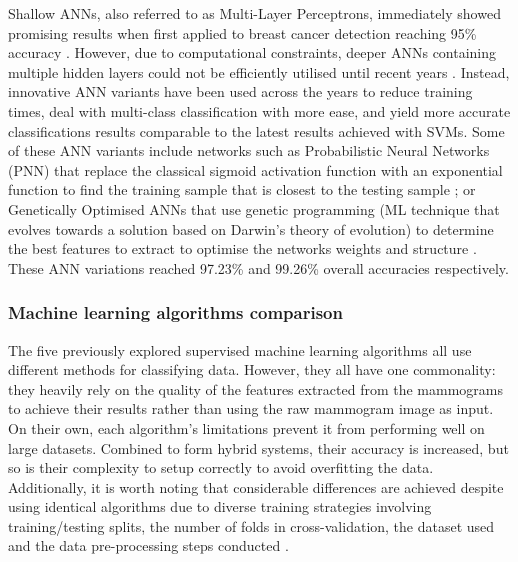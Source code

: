 Shallow ANNs, also referred to as Multi-Layer Perceptrons, immediately showed promising results when first applied to breast cancer detection reaching 95\% accuracy \cite{Wu1993}. However, due to computational constraints, deeper ANNs containing multiple hidden layers could not be efficiently utilised until recent years \cite{Litjens2017}. Instead, innovative ANN variants have been used across the years to reduce training times, deal with multi-class classification with more ease, and yield more accurate classifications results comparable to the latest results achieved with SVMs. Some of these ANN variants include networks such as Probabilistic Neural Networks (PNN) that replace the classical sigmoid activation function with an exponential function to find the training sample that is closest to the testing sample \cite{Osareh2010}; or Genetically Optimised ANNs that use genetic programming (ML technique that evolves towards a solution based on Darwin's theory of evolution) to determine the best features to extract to optimise the networks weights and structure \cite{Bhardwaj2015}. These ANN variations reached 97.23\% and 99.26\% overall accuracies respectively.



\subsubsection{Machine learning algorithms comparison}

The five previously explored supervised machine learning algorithms all use different methods for classifying data. However, they all have one commonality: they heavily rely on the quality of the features extracted from the mammograms to achieve their results rather than using the raw mammogram image as input. On their own, each algorithm's limitations prevent it from performing well on large datasets. Combined to form hybrid systems, their accuracy is increased, but so is their complexity to setup correctly to avoid overfitting the data. Additionally, it is worth noting that considerable differences are achieved despite using identical algorithms due to diverse training strategies involving training/testing splits, the number of folds in cross-validation, the dataset used and the data pre-processing steps conducted \cite{Yue2018}.\\

